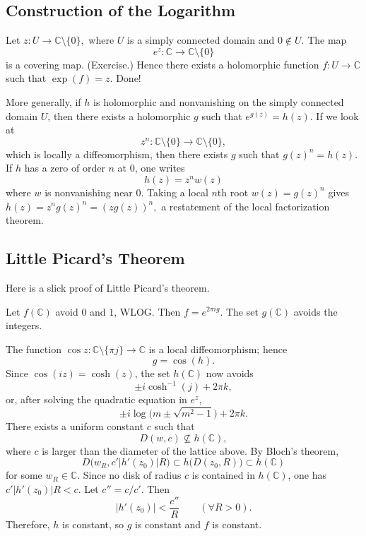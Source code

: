 \documentclass[11pt,a4paper]{article}
\begin{document}

\subsection*{Construction of the Logarithm}

Let \(z:U\to\mathbb C\setminus\{0\},\)
where $U$ is a simply connected domain and $0\notin U$. The map
\[
  e^z:\mathbb C\to\mathbb C\setminus\{0\}
\]
is a covering map. (Exercise.) Hence there exists a holomorphic function $f:U\to\mathbb C$ such that \(\exp(f)=z.\)
Done!


More generally, if $h$ is holomorphic and nonvanishing on the simply connected domain $U$, then there exists a holomorphic $g$ such that \(e^{g(z)}=h(z).\)
If we look at
\[
  z^n:\mathbb C\setminus\{0\}\to\mathbb C\setminus\{0\},
\]
which is locally a diffeomorphism, then there exists $g$ such that \(g(z)^n=h(z).\)
If $h$ has a zero of order $n$ at $0$, one writes
\[
  h(z)=z^nw(z)
\]
where $w$ is nonvanishing near $0$. Taking a local $n$th root $w(z)=g(z)^n$ gives \(h(z)=z^ng(z)^n=(zg(z))^n,\)
a restatement of the local factorization theorem.

\subsection*{Little Picard's Theorem}

Here is a slick proof of Little Picard's theorem.


Let $f(\mathbb C)$ avoid $0$ and $1$, WLOG. Then \(f=e^{2\pi i g}.\)
The set $g(\mathbb C)$ avoids the integers.

The function $\cos z:\mathbb C\setminus\{\pi j\}\to\mathbb C$ is a local diffeomorphism; hence
\[
  g=\cos(h).
\]
Since $\cos(iz)=\cosh(z)$, the set $h(\mathbb C)$ now avoids
\[
  \pm i\cosh^{-1}(j)+2\pi k,
\]
or, after solving the quadratic equation in $e^z$,
\[
  \pm i\log\bigl(m\pm\sqrt{m^2-1}\bigr)+2\pi k.
\]
There exists a uniform constant $c$ such that
\[
  D(w,c)\nsubseteq h(\mathbb C),
\]
where $c$ is larger than the diameter of the lattice above. By Bloch's theorem,
\[
  D\bigl(w_R,c'|h'(z_0)|R\bigr)\subset h\bigl(D(z_0,R)\bigr)
  \subset h(\mathbb C)
\]
for some $w_R\in\mathbb C$. Since no disk of radius $c$ is contained in $h(\mathbb C)$, one has $c'|h'(z_0)|R<c$.
Let $c''=c/c'$. Then
\[
  |h'(z_0)|<\frac{c''}{R}
  \qquad(\forall R>0).
\]
Therefore, $h$ is constant, so $g$ is constant and $f$ is constant.
\end{document}
